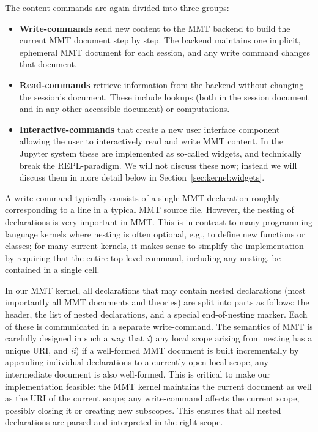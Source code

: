 The content commands are again divided into three groups:
\begin{itemize}
 \item \textbf{Write-commands} send new content to the MMT backend to build the current MMT document step by step.
   The backend maintains one implicit, ephemeral MMT document for each session, and any write command changes that document.
 \item \textbf{Read-commands} retrieve information from the backend without changing the session's document.
   These include lookups (both in the session document and in any other accessible document) or computations.
  \item \textbf{Interactive-commands} that create a new user interface component allowing the user to interactively read and write MMT content. 
   In the Jupyter system these are implemented as so-called widgets, and technically break the REPL-paradigm. 
   We will not discuss these now; instead we will discuss them in more detail below in Section~\ref{sec:kernel:widgets}. 
\end{itemize}

A write-command typically consists of a single MMT declaration roughly corresponding to a line in a typical MMT source file.
However, the nesting of declarations is very important in MMT.
This is in contrast to many programming language kernels where nesting is often optional, e.g., to define new functions or classes;
for many current kernels, it makes sense to simplify the implementation by requiring that the entire top-level command, including any nesting, be contained in a single cell.

In our MMT kernel, all declarations that may contain nested declarations (most importantly all MMT documents and theories) are split into parts as follows: the header, the list of nested declarations, and a special end-of-nesting marker.
Each of these is communicated in a separate write-command.
The semantics of MMT is carefully designed in such a way that \emph{i}) any local scope arising from nesting has a unique URI, and \emph{ii}) if a well-formed MMT document is built incrementally by appending individual declarations to a currently open local scope, any intermediate document is also well-formed.
This is critical to make our implementation feasible: the MMT kernel maintains the current document as well as the URI of the current scope; any write-command affects the current scope, possibly closing it or creating new subscopes.
This ensures that all nested declarations are parsed and interpreted in the right scope.

